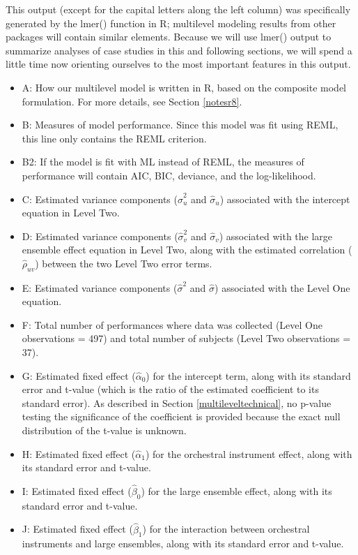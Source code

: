 \documentclass[
]{krantz}
\providecommand{\tightlist}{%
  \setlength{\itemsep}{0pt}\setlength{\parskip}{0pt}}
\begin{document}
This output (except for the capital letters along the left column) was specifically generated by the lmer() function in R; multilevel modeling results from other packages will contain similar elements. Because we will use lmer() output to summarize analyses of case studies in this and following sections, we will spend a little time now orienting ourselves to the most important features in this output.

\begin{itemize}
\tightlist
\item
  A: How our multilevel model is written in R, based on the composite model formulation. For more details, see Section \ref{notesr8}.
\item
  B: Measures of model performance. Since this model was fit using REML, this line only contains the REML criterion.
\item
  B2: If the model is fit with ML instead of REML, the measures of performance will contain AIC, BIC, deviance, and the log-likelihood.
\item
  C: Estimated variance components (\(\hat{\sigma}_{u}^2\) and \(\hat{\sigma}_{u}\)) associated with the intercept equation in Level Two.
\item
  D: Estimated variance components (\(\hat{\sigma}_{v}^2\) and \(\hat{\sigma}_{v}\)) associated with the large ensemble effect equation in Level Two, along with the estimated correlation (\(\hat{\rho}_{uv}\)) between the two Level Two error terms.
\item
  E: Estimated variance components (\(\hat{\sigma}^2\) and \(\hat{\sigma}\)) associated with the Level One equation.
\item
  F: Total number of performances where data was collected (Level One observations = 497) and total number of subjects (Level Two observations = 37).
\item
  G: Estimated fixed effect (\(\hat{\alpha}_{0}\)) for the intercept term, along with its standard error and t-value (which is the ratio of the estimated coefficient to its standard error). As described in Section \ref{multileveltechnical}, no p-value testing the significance of the coefficient is provided because the exact null distribution of the t-value is unknown.
\item
  H: Estimated fixed effect (\(\hat{\alpha}_{1}\)) for the orchestral instrument effect, along with its standard error and t-value.
\item
  I: Estimated fixed effect (\(\hat{\beta}_{0}\)) for the large ensemble effect, along with its standard error and t-value.
\item
  J: Estimated fixed effect (\(\hat{\beta}_{1}\)) for the interaction between orchestral instruments and large ensembles, along with its standard error and t-value.
\end{itemize}
\end{document}
